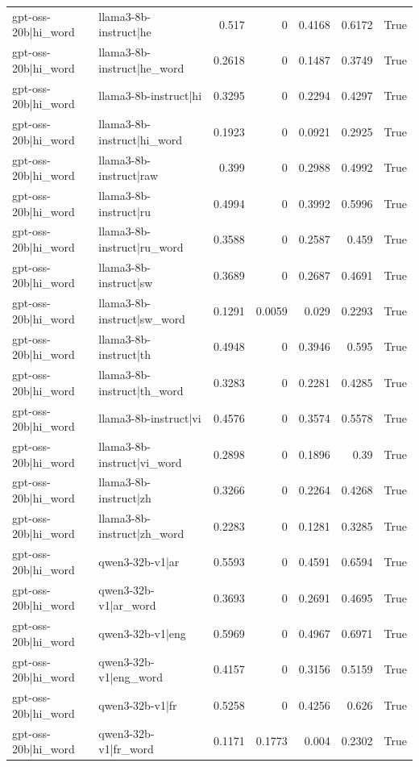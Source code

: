 \begin{table}
\begin{tabular}{l l r r r r l}
gpt-oss-20b|hi_word & llama3-8b-instruct|he & 0.517 & 0 & 0.4168 & 0.6172 & True \\
gpt-oss-20b|hi_word & llama3-8b-instruct|he_word & 0.2618 & 0 & 0.1487 & 0.3749 & True \\
gpt-oss-20b|hi_word & llama3-8b-instruct|hi & 0.3295 & 0 & 0.2294 & 0.4297 & True \\
gpt-oss-20b|hi_word & llama3-8b-instruct|hi_word & 0.1923 & 0 & 0.0921 & 0.2925 & True \\
gpt-oss-20b|hi_word & llama3-8b-instruct|raw & 0.399 & 0 & 0.2988 & 0.4992 & True \\
gpt-oss-20b|hi_word & llama3-8b-instruct|ru & 0.4994 & 0 & 0.3992 & 0.5996 & True \\
gpt-oss-20b|hi_word & llama3-8b-instruct|ru_word & 0.3588 & 0 & 0.2587 & 0.459 & True \\
gpt-oss-20b|hi_word & llama3-8b-instruct|sw & 0.3689 & 0 & 0.2687 & 0.4691 & True \\
gpt-oss-20b|hi_word & llama3-8b-instruct|sw_word & 0.1291 & 0.0059 & 0.029 & 0.2293 & True \\
gpt-oss-20b|hi_word & llama3-8b-instruct|th & 0.4948 & 0 & 0.3946 & 0.595 & True \\
gpt-oss-20b|hi_word & llama3-8b-instruct|th_word & 0.3283 & 0 & 0.2281 & 0.4285 & True \\
gpt-oss-20b|hi_word & llama3-8b-instruct|vi & 0.4576 & 0 & 0.3574 & 0.5578 & True \\
gpt-oss-20b|hi_word & llama3-8b-instruct|vi_word & 0.2898 & 0 & 0.1896 & 0.39 & True \\
gpt-oss-20b|hi_word & llama3-8b-instruct|zh & 0.3266 & 0 & 0.2264 & 0.4268 & True \\
gpt-oss-20b|hi_word & llama3-8b-instruct|zh_word & 0.2283 & 0 & 0.1281 & 0.3285 & True \\
gpt-oss-20b|hi_word & qwen3-32b-v1|ar & 0.5593 & 0 & 0.4591 & 0.6594 & True \\
gpt-oss-20b|hi_word & qwen3-32b-v1|ar_word & 0.3693 & 0 & 0.2691 & 0.4695 & True \\
gpt-oss-20b|hi_word & qwen3-32b-v1|eng & 0.5969 & 0 & 0.4967 & 0.6971 & True \\
gpt-oss-20b|hi_word & qwen3-32b-v1|eng_word & 0.4157 & 0 & 0.3156 & 0.5159 & True \\
gpt-oss-20b|hi_word & qwen3-32b-v1|fr & 0.5258 & 0 & 0.4256 & 0.626 & True \\
gpt-oss-20b|hi_word & qwen3-32b-v1|fr_word & 0.1171 & 0.1773 & 0.004 & 0.2302 & True \\

\end{tabular}
\end{table}
